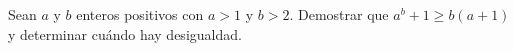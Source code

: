 Sean $a$ y $b$ enteros positivos con $a>1$ y $b>2$. Demostrar que $a^b+1\ge b(a+1)$ y determinar cuándo hay desigualdad.
